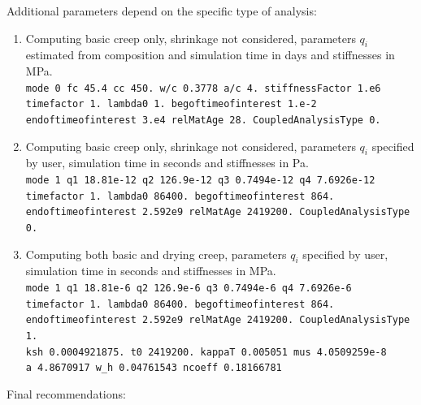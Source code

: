 \documentclass[a4paper]{article}
\begin{document}
Additional parameters
depend on the specific type of analysis:
\begin{enumerate}
\item
Computing basic creep only, shrinkage not considered,
parameters $q_i$ estimated from composition and simulation time in
days and stiffnesses in MPa.\\
{\tt mode 0 fc 45.4 cc 450. w/c 0.3778 a/c 4. stiffnessFactor 1.e6\\
  timefactor 1. lambda0 1. begoftimeofinterest 1.e-2 \\
endoftimeofinterest 3.e4  relMatAge 28.  CoupledAnalysisType 0.} 

\item
Computing basic creep only, shrinkage not considered,
parameters $q_i$ specified by user, simulation time in seconds and stiffnesses in Pa.\\
{\tt mode 1 q1 18.81e-12 q2 126.9e-12 q3 0.7494e-12 q4 7.6926e-12 \\
 timefactor 1. lambda0 86400. begoftimeofinterest 864.\\
 endoftimeofinterest 2.592e9 relMatAge 2419200. CoupledAnalysisType 0.} 

\item
Computing both basic and drying creep, 
parameters $q_i$ specified by user, simulation time in seconds and stiffnesses in MPa.\\
{\tt mode 1 q1 18.81e-6 q2 126.9e-6 q3 0.7494e-6 q4 7.6926e-6\\ 
  timefactor 1. lambda0 86400. begoftimeofinterest 864.\\ 
endoftimeofinterest 2.592e9  relMatAge 2419200. CoupledAnalysisType
1. \\
ksh 0.0004921875. t0 2419200. kappaT 0.005051 mus 4.0509259e-8 \\
a 4.8670917 w\_h 0.04761543 ncoeff 0.18166781} 


\end{enumerate}

Final recommendations:
\end{document}
